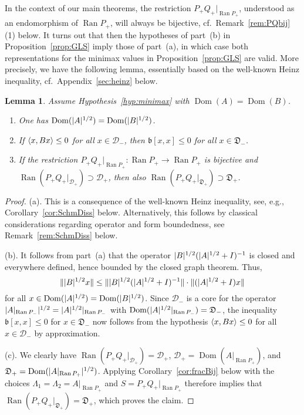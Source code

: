 \documentclass[11pt,a4paper]{amsart}
\numberwithin{equation}{section}
\DeclareMathOperator{\Ran}{Ran}
\DeclareMathOperator{\Dom}{Dom}
\DeclarePairedDelimiter{\abs}{|}{|}
\DeclarePairedDelimiter{\norm}{\lVert}{\rVert}
\DeclarePairedDelimiter{\scprod}{\langle}{\rangle}
\newcommand{\cD}{{\mathcal D}}
\newcommand{\fb}{{\mathfrak b}}
\newcommand{\fD}{{\mathfrak D}}
\theoremstyle{plain}
\newtheorem{lemma}[theorem]{Lemma}
\theoremstyle{definition}
\theoremstyle{remark}
\begin{document}
In the context of our main theorems, the restriction $P_+Q_+|_{\Ran P_+}$, understood as an endomorphism of $\Ran P_+$, will
always be bijective, cf.~Remark~\ref{rem:PQbij}\,(1) below. It turns out that then the hypotheses of part~(b) in
Proposition~\ref{prop:GLS} imply those of part~(a), in which case both representations for the minimax values in
Proposition~\ref{prop:GLS} are valid. More precisely, we have the following lemma, essentially based on the well-known Heinz
inequality, cf.~Appendix~\ref{sec:heinz} below.

\begin{lemma}\label{lem:GLS}
  Assume Hypothesis~\ref{hyp:minimax} with $\Dom(A) = \Dom(B)$.
  \begin{enumerate}
    \renewcommand{\theenumi}{\alph{enumi}}
    
    \item One has $\Dom(\abs{A}^{1/2}) = \Dom(\abs{B}^{1/2})$.

    \item If $\scprod{x , Bx} \le 0$ for all $x \in \cD_-$, then $\fb[x , x] \le 0$ for all $x \in \fD_-$.

    \item If the restriction $P_+Q_+|_{\Ran P_+} \colon \Ran P_+ \to \Ran P_+$ is bijective and
          $\Ran(P_+Q_+|_{\cD_+}) \supset \cD_+$, then also $\Ran(P_+Q_+|_{\fD_+}) \supset \fD_+$.

  \end{enumerate}
\end{lemma}

\begin{proof}
  (a).
  This is a consequence of the well-known Heinz inequality, see, e.g., Corollary~\ref{cor:SchmDiss} below. Alternatively, this
  follows by classical considerations regarding operator and form boundedness, see Remark~\ref{rem:SchmDiss} below.
  
  (b).
  It follows from part~(a) that the operator $\abs{B}^{1/2} ( \abs{A}^{1/2} + I )^{-1}$ is closed and everywhere defined, hence
  bounded by the closed graph theorem. Thus,
  \begin{equation*}
    \norm{\abs{B}^{1/2}x} \le \norm{\abs{B}^{1/2}(\abs{A}^{1/2}+I)^{-1}}\cdot \norm{(\abs{A}^{1/2}+I)x}
  \end{equation*}
  for all $x\in \Dom(\abs{A}^{1/2})=\Dom(\abs{B}^{1/2})$. Since $\cD_-$ is a core for the operator
  $\abs{A|_{\Ran P_-}}^{1/2}=\abs{A}^{1/2}|_{\Ran P_-}$ with $\Dom(\abs{A}^{1/2}|_{\Ran P_-})=\fD_-$, the inequality
  $\fb[x,x]\le 0$ for $x\in\fD_-$ now follows from the hypothesis $\scprod{ x,Bx } \le 0$ for all $x\in\cD_-$ by approximation.

  (c).
  We clearly have $\Ran(P_+Q_+|_{\cD_+})=\cD_+$, $\cD_+=\Dom(A|_{\Ran P_+})$, and $\fD_+=\Dom(\abs{A|_{\Ran P_+}}^{1/2})$.
  Applying Corollary~\ref{cor:fracBij} below with the choices $\Lambda_1=\Lambda_2=A|_{\Ran P_+}$ and $S = P_+Q_+|_{\Ran P_+}$
  therefore implies that $\Ran(P_+Q_+|_{\fD_+})=\fD_+$, which proves the claim.
\end{proof}%
\end{document}
